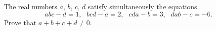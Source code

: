 The real numbers $a$, $b$, $c$, $d$ satisfy simultaneously the equations\[abc -d = 1, \ \ \  bcd - a = 2, \ \ \   cda- b = 3, \ \ \   dab - c = -6.\] Prove that $a + b + c + d \not = 0$.